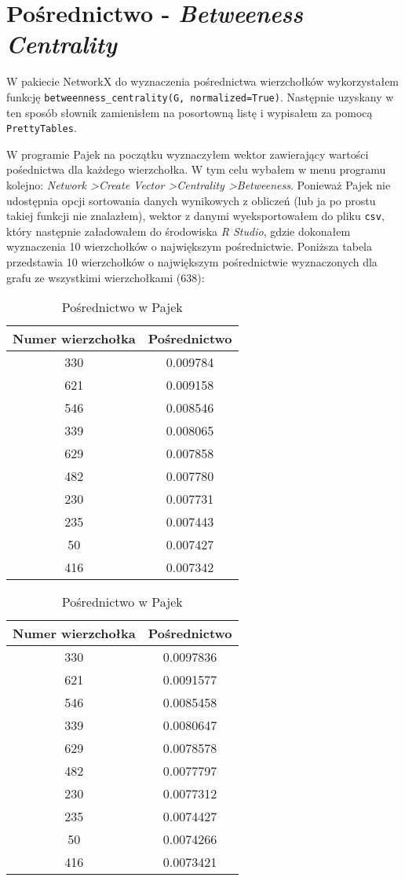 \documentclass[a4paper,10pt]{article}
\begin{document}
	

	\section{Pośrednictwo - \emph{Betweeness Centrality}}
			W pakiecie NetworkX do wyznaczenia pośrednictwa wierzchołków wykorzystałem funkcję \texttt{betweenness\_centrality(G, normalized=True)}. Następnie uzyskany w ten sposób słownik zamienisłem na posortowną listę i wypisałem za pomocą \texttt{PrettyTables}. 

			W programie Pajek na początku wyznaczyłem wektor zawierający wartości pośednictwa dla każdego wierzchołka. W tym celu wybałem w menu programu kolejno: \textit{Network \textgreater Create Vector \textgreater Centrality \textgreater Betweeness}. Ponieważ Pajek nie udostępnia opcji sortowania danych wynikowych z obliczeń (lub ja po prostu takiej funkcji nie znalazłem), wektor z danymi wyeksportowałem do pliku \texttt{csv}, który następnie załadowałem do środowiska \textit{R Studio}, gdzie dokonałem wyznaczenia 10 wierzchołków o największym pośrednictwie. 
			Poniższa tabela przedstawia 10 wierzchołków o największym pośrednictwie wyznaczonych dla grafu ze wszystkimi wierzchołkami (638):
			\begin{table}[H]
			\parbox{.45\linewidth}{
			\caption*{Pośrednictwo w \mbox{NetworkX}}
			\begin{tabular}{ c | c } \hline
				Numer wierzchołka & Pośrednictwo \\ \hline
				330 & 0.009784  \\
				621 & 0.009158 \\
				546 & 0.008546 \\
				339 & 0.008065 \\
				629 & 0.007858 \\
				482 & 0.007780 \\
				230 & 0.007731 \\
				235 & 0.007443 \\
				50 & 0.007427 \\
				416 & 0.007342 \\\hline
			\end{tabular}
			}
			\hfill
			\parbox{.45\linewidth}{
			\caption*{Pośrednictwo w Pajek}
			\begin{tabular}{ c | c } \hline
				Numer wierzchołka & Pośrednictwo \\ \hline
				330 & 0.0097836 \\
				621 & 0.0091577 \\
				546 & 0.0085458 \\
				339 & 0.0080647 \\
				629 & 0.0078578 \\
				482 & 0.0077797 \\
				230 & 0.0077312 \\
				235 & 0.0074427 \\
				50  & 0.0074266 \\
				416  & 0.0073421 \\\hline
			\end{tabular}
			}
			\end{table}
\end{document}
